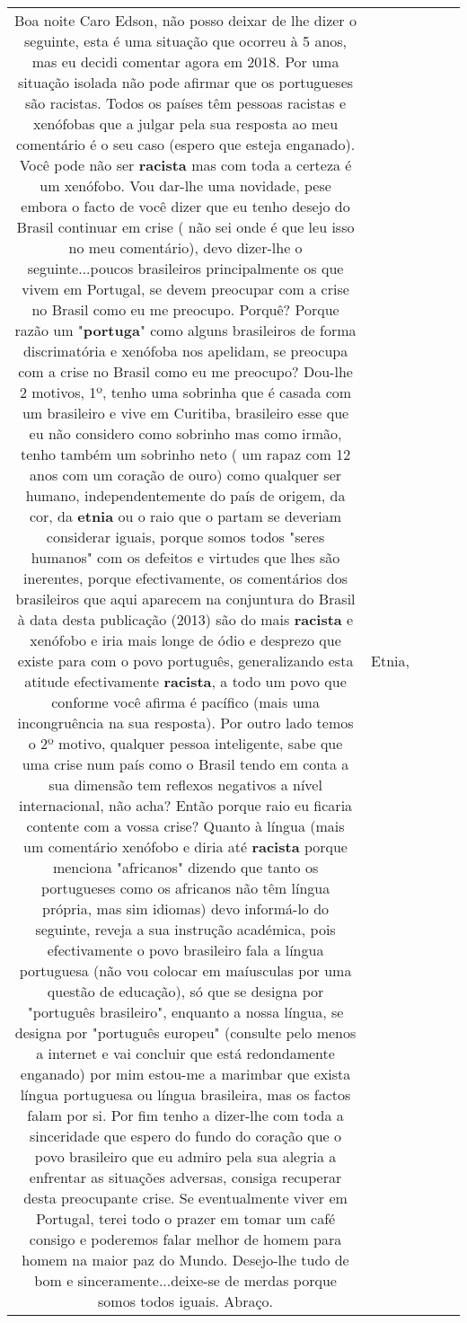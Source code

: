 \documentclass[11pt]{article}
\newlength\mylength
\begin{document}
\begin{center}
\begin{longtable}{|C{.65\mylength}|C{.30\mylength}|C{.12\mylength}|C{.12\mylength}|C{.12\mylength}|}
  \small Boa noite Caro Edson, não posso deixar de lhe dizer o seguinte, esta é uma situação que ocorreu à 5 anos, mas eu decidi comentar agora em 2018. Por uma situação isolada não pode afirmar que os portugueses são racistas. Todos os países têm pessoas racistas e xenófobas que a julgar pela sua resposta ao meu comentário é o seu caso (espero que esteja enganado). Você pode não ser \textbf{racista} mas com toda a certeza é um xenófobo. Vou dar-lhe uma novidade, pese embora o facto de você dizer que eu tenho desejo do Brasil continuar em crise ( não sei onde é que leu isso no meu comentário), devo dizer-lhe o seguinte...poucos brasileiros principalmente os que vivem em Portugal, se devem preocupar com a crise no Brasil como eu me preocupo. Porquê? Porque razão um "\textbf{portuga}" como alguns brasileiros de forma discrimatória e xenófoba nos apelidam, se preocupa com a crise no Brasil como eu me preocupo? Dou-lhe 2 motivos, 1º, tenho uma sobrinha que é casada com um brasileiro e vive em Curitiba, brasileiro esse que eu não considero como sobrinho mas como irmão, tenho também um sobrinho neto ( um rapaz com 12 anos com um coração de ouro) como qualquer ser humano, independentemente do país de origem, da cor, da \textbf{etnia} ou o raio que o partam se deveriam considerar iguais, porque somos todos "seres humanos" com os defeitos e virtudes que lhes são inerentes, porque efectivamente, os comentários dos brasileiros que aqui aparecem na conjuntura do Brasil à data desta publicação (2013) são do mais \textbf{racista} e xenófobo e iria mais longe de ódio e desprezo que existe para com o povo português, generalizando esta atitude efectivamente \textbf{racista}, a todo um povo que conforme você afirma é pacífico (mais uma incongruência na sua resposta). Por outro lado temos o 2º motivo, qualquer pessoa inteligente, sabe que uma crise num país como o Brasil tendo em conta a sua dimensão tem reflexos negativos a nível internacional, não acha? Então porque raio eu ficaria contente com a vossa crise? Quanto à língua (mais um comentário xenófobo e diria até \textbf{racista} porque menciona "africanos" dizendo que tanto os portugueses como os africanos não têm língua própria, mas sim idiomas) devo informá-lo do seguinte, reveja a sua instrução académica, pois efectivamente o povo brasileiro fala a língua portuguesa (não vou colocar em maíusculas por uma questão de educação), só que se designa por "português brasileiro", enquanto a nossa língua, se designa por "português europeu" (consulte pelo menos a internet e vai concluir que está redondamente enganado) por mim estou-me a marimbar que exista língua portuguesa ou língua brasileira, mas os factos falam por si. Por fim tenho a dizer-lhe com toda a sinceridade que espero do fundo do coração que o povo brasileiro que eu admiro pela sua alegria a enfrentar as situações adversas, consiga recuperar desta preocupante crise. Se eventualmente viver em Portugal, terei todo o prazer em tomar um café consigo e poderemos falar melhor de homem para homem na maior paz do Mundo. Desejo-lhe tudo de bom e sinceramente...deixe-se de merdas porque somos todos iguais. Abraço.\normalsize   & Etnia, 
\end{longtable}
\end{center}
\end{document}

